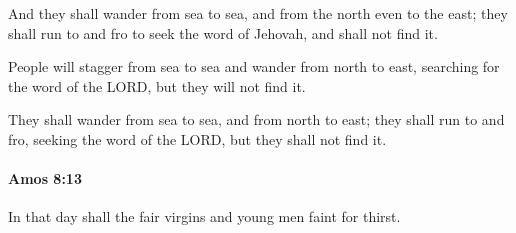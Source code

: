 			\begin{versebox}
					\item[BHS] 
					\item[LXX] 
					\item[ASV] And they shall wander from sea to sea, and from the north even to the east; they shall run to and fro to seek the word of Jehovah, and shall not find it.
					\item[NIV] People will stagger from sea to sea and wander from north to east, searching for the word of the LORD, but they will not find it.
					\item[NRSV] They shall wander from sea to sea, and from north to east; they shall run to and fro, seeking the word of the LORD, but they shall not find it.
			\end{versebox}

		\paragraph{Amos 8:13} %
			\label{AMOS-8-13}

			In that day shall the fair virgins and young men faint for thirst.

